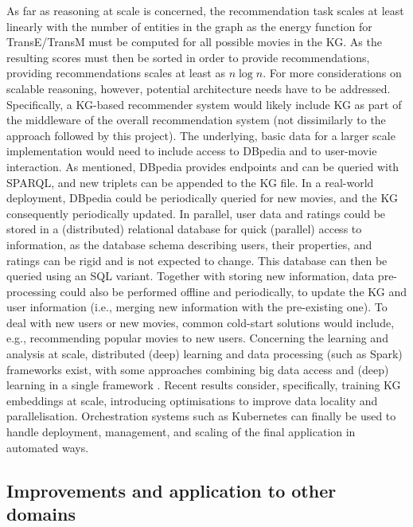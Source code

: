 As far as reasoning at scale is concerned, the recommendation task scales at least linearly with the number of entities in the graph as the energy function for TransE/TransM must be computed for all possible movies in the KG.
As the resulting scores must then be sorted in order to provide recommendations, providing recommendations scales at least as $n\log{n}$.
For more considerations on scalable reasoning, however, potential architecture needs have to be addressed.
Specifically, a KG-based recommender system would likely include KG as part of the middleware of the overall recommendation system (not dissimilarly to the approach followed by this project).
The underlying, basic data for a larger scale implementation would need to include access to DBpedia and to user-movie interaction.
As mentioned, DBpedia provides endpoints and can be queried with SPARQL, and new triplets can be appended to the KG file.
In a real-world deployment, DBpedia could be periodically queried for new movies, and the KG consequently periodically updated.
In parallel, user data and ratings could be stored in a (distributed) relational database for quick (parallel) access to information, as the database schema describing users, their properties, and ratings can be rigid and is not expected to change.
This database can then be queried using an SQL variant.
Together with storing new information, data pre-processing could also be performed offline and periodically, to update the KG and user information (i.e., merging new information with the pre-existing one).
To deal with new users or new movies, common cold-start solutions would include, e.g., recommending popular movies to new users.
Concerning the learning and analysis at scale, distributed (deep) learning and data processing (such as Spark) frameworks exist, with some approaches combining big data access and (deep) learning in a single framework \parencite{kim2016deepspark}.
Recent results \parencite{zheng2020dgl} consider, specifically, training KG embeddings at scale, introducing optimisations to improve data locality and parallelisation.
Orchestration systems such as Kubernetes can finally be used to handle deployment, management, and scaling of the final application in automated ways.


\subsection{Improvements and application to other domains}

